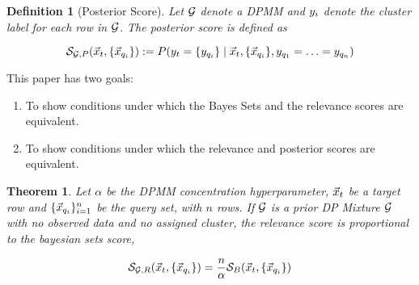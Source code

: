 \documentclass{article}
\theoremstyle{break}
\newtheorem{theorem}{Theorem}[section]
\newtheorem{definition}{Definition}[section]
\begin{document}
    \begin{definition}[Posterior Score]
      Let $\mathcal{G}$ denote a DPMM and $y_i$ denote the
      cluster label for each row in $\mathcal{G}$. The posterior score is defined as
      
      \begin{equation}
        \mathcal{S}_{\mathcal{G},P} (\vec x_t, \{{\vec x_{q_i}}\}) :=
            P(y_t = \{{y_{q_i}}\} \mid \vec x_t, \{{\vec x_{q_i}}\}, y_{q_1}=\ldots=y_{q_n})
      \end{equation}
    \end{definition}
    
    This paper has two goals:
    \begin{enumerate}
    \item To show conditions under which the Bayes Sets and the relevance scores
      are equivalent.
    \item To show conditions under which the relevance and posterior scores are
      equivalent.
    \end{enumerate}

    \begin{theorem}
      Let $\alpha$ be the DPMM concentration hyperparameter, $\vec x_t$ be a
      target row and $\{{\vec x_{q_i}}\}_{i=1}^n$ be the query set, with $n$ rows.
      If $\mathcal{G}$ is a prior DP Mixture $\mathcal{G}$ with no observed data and
      no assigned cluster, the relevance score is proportional to
      the bayesian sets score,

      \begin{equation}
        \mathcal{S}_{\mathcal{G}, R}(\vec x_t, \{{\vec x_{q_i}}\}) = \frac{n}{\alpha} \mathcal{S}_B(\vec x_t, \{{\vec x_{q_i}}\})
      \end{equation}
    \end{theorem}
\end{document}
